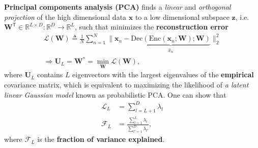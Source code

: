 \textbf{Principal components analysis (PCA)} finds a \textit{linear} and \textit{orthogonal} 
\textit{projection} of the high dimensional data $\bm{x}$ to a low dimensional subspace $\bm{z}$, 
i.e. $\mathbf{W}^\mathsf{T}\in\mathbb{R}^{L\times D}:\mathbb{R}^D\to \mathbb{R}^L$, such that minimizes the \textbf{reconstruction error}
\begin{gather}
    \mathcal{L}(\mathbf{W})\triangleq\frac{1}{N}\sum_{n=1}^N\|\bm{x}_n-\underbrace{\text{Dec}(\text{Enc}(\bm{x}_n;\mathbf{W});\mathbf{W})}_{\hat{x}_n}\|_2^2 \\
    \Rightarrow\mathbf{U}_L=\mathbf{W}^*=\min_{\mathbf{W}}\mathcal{L}(\mathbf{W}),
\end{gather}
where $\mathbf{U}_L$ contains $L$ eigenvectors with the largest eigenvalues of the \textbf{empirical} covariance matrix,
which is equivalent to maximizing the likelihood of \textit{a latent linear Gaussian model} known as probabilistic PCA.
One can show that
\begin{align}
    \mathcal{L}_L
    & = \sum_{l=L+1}^D \lambda_l \\
    \mathcal{F}_L
    & = \frac{\sum_{l=1}^L\lambda_l}{\sum_{l'=1}^D\lambda_{l'}},
\end{align}
where $\mathcal{F}_L$ is the \textbf{fraction of variance explained}.

